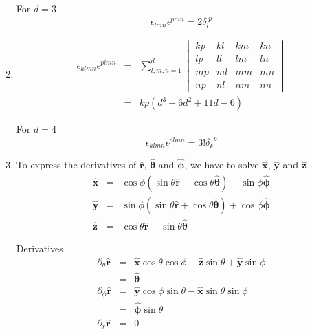 \documentclass[12pt,a4paper]{article}
\begin{document}
\begin{enumerate}
For $d=3$ 
\begin{equation}
	\epsilon_{lmn}\epsilon^{pmn} = 2 \delta_{l}^{\phantom lp}
\end{equation}





\item


\begin{eqnarray*}
	\epsilon_{klmn}\epsilon^{plmn} &=& \sum_{l,m,n=1}^{d} 
	\begin{vmatrix}
	kp & kl & km & kn \\
	lp & ll & lm & ln \\
	mp & ml & mm & mn \\
	np & nl & nm & nn
	\end{vmatrix}\\
&=& kp(d^3 + 6d^2 + 11d -6 )
\end{eqnarray*}

For $d=4$
\begin{equation}
	\epsilon_{klmn}\epsilon^{plmn} = 3! \delta_{k}^{\phantom kp}
\end{equation}




\item
To express the derivatives of $\bm{\hat r}$, $\bm{\hat \theta}$ and $\bm{\hat \phi}$, we have to solve $\bm{\hat x}$, $\bm{\hat y}$ and $\bm{\hat z}$
\begin{eqnarray*}
	\bm{\hat x} &=& \cos\phi (\sin\theta \bm{\hat r} + \cos\theta \bm{\hat \theta}) - \sin \phi \bm{\hat \phi} \\
	\bm{\hat y}&=& \sin\phi (\sin\theta \bm{\hat r} + \cos\theta \bm{\hat \theta}) + \cos\phi \bm{\hat \phi}\\
	\bm{\hat z} &=& \cos\theta\bm{\hat r} - \sin\theta\bm{\hat \theta}
\end{eqnarray*}


Derivatives
\begin{eqnarray*}
	\partial_\theta \bm{\hat r} &=& \bm{\hat x}\cos\theta \cos\phi - \bm{\hat z} \sin\theta  + \bm{\hat y} \sin\phi \\
	&=& \bm{\hat \theta} \\
	\partial_\phi \bm{\hat r} &= & \bm{\hat y}\cos\phi\sin\theta - \bm{\hat x} \sin\theta \sin\phi \\
	&=& \bm{\hat \phi}\sin\theta \\
	\partial_r\bm{\hat r} &=& 0
\end{eqnarray*}


\end{enumerate}
\end{document}

